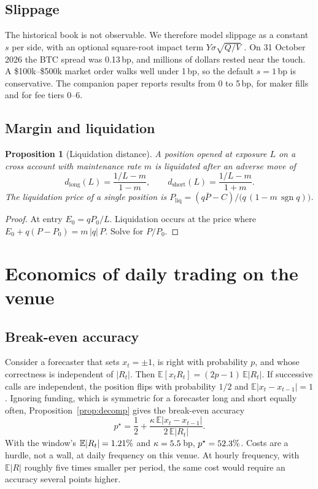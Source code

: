 \documentclass[11pt]{article}
\newtheorem{proposition}{Proposition}
\theoremstyle{remark}
\newcommand{\E}{\mathbb{E}}
\newcommand{\sgn}{\operatorname{sgn}}
\begin{document}
\subsection{Slippage}
The historical book is not observable. We therefore model slippage as a constant $s$ per side, with an optional square-root impact term $Y\sigma\sqrt{Q/V}$ \citep{almgren2005direct,toth2011anomalous,almgren2001optimal}. On 31 October 2026 the BTC spread was 0.13\,bp, and millions of dollars rested near the touch. A \$100k--\$500k market order walks well under 1\,bp, so the default $s=1$\,bp is conservative. The companion paper reports results from 0 to 5\,bp, for maker fills and for fee tiers 0--6.

\subsection{Margin and liquidation}
\begin{proposition}[Liquidation distance]\label{prop:liq}
A position opened at exposure $L$ on a cross account with maintenance rate $m$ is liquidated after an adverse move of
\[
d_{\text{long}}(L) = \frac{1/L - m}{1-m},\qquad d_{\text{short}}(L) = \frac{1/L - m}{1+m}.
\]
The liquidation price of a single position is $P_{\text{liq}} = (q\bar P - C)/\big(q\,(1 - m\,\sgn q)\big)$.
\end{proposition}
\begin{proof}
At entry $E_0 = qP_0/L$. Liquidation occurs at the price where $E_0 + q(P-P_0) = m\,|q|\,P$. Solve for $P/P_0$.
\end{proof}

\section{Economics of daily trading on the venue}\label{sec:econ}

\subsection{Break-even accuracy}
Consider a forecaster that sets $x_t=\pm1$, is right with probability $p$, and whose correctness is independent of $|R_t|$. Then $\E[x_tR_t]=(2p-1)\,\E|R_t|$. If successive calls are independent, the position flips with probability $1/2$ and $\E|x_t-x_{t-1}|=1$. Ignoring funding, which is symmetric for a forecaster long and short equally often, Proposition~\ref{prop:decomp} gives the break-even accuracy
\begin{equation}\label{eq:breakeven}
p^\star = \frac12 + \frac{\kappa\,\E|x_t-x_{t-1}|}{2\,\E|R_t|}.
\end{equation}
With the window's $\E|R_t|=\BTCabs$ and $\kappa = 5.5$\,bp, $p^\star=52.3\%$. Costs are a hurdle, not a wall, at daily frequency on this venue. At hourly frequency, with $\E|R|$ roughly five times smaller per period, the same cost would require an accuracy several points higher.
\end{document}
